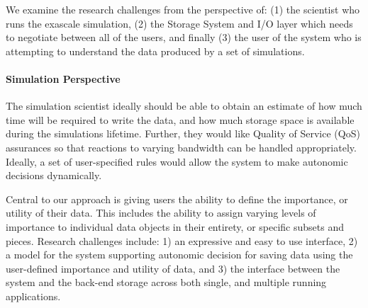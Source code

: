 We  examine the research challenges from the perspective of:
%
(1) the scientist who runs the exascale simulation,
%
(2) the Storage System and I/O layer which needs to negotiate between all of
the users, and finally
%
(3) the user of the system who is attempting to understand the data
produced by a set of simulations.

\paragraph{Simulation Perspective}
\label{subsec:sim-perspective}
The simulation scientist ideally should be able to
obtain an estimate of how much time will be required to write the data,
and how much storage space is available during the simulations lifetime.
Further, they would like Quality of Service (QoS) assurances so that reactions
to varying bandwidth can be handled appropriately. Ideally, a set of
user-specified rules would allow the system to make autonomic decisions dynamically.
%

Central to our approach is giving users the ability to define the importance, or utility of their data.
This includes the ability to assign varying levels of importance to individual data objects in their entirety, or specific
subsets and pieces.
Research challenges include: 1) an expressive and easy to use interface, 2) a model for the system supporting
autonomic decision for saving data using the user-defined importance and utility of data, and 3) the interface between
the system and the back-end storage across both single, and multiple running applications.


